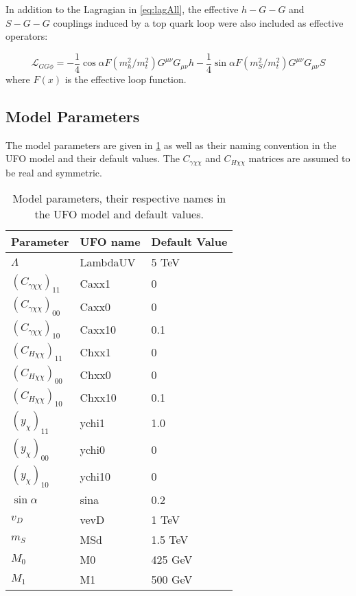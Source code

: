 \documentclass[a4paper,11pt]{article}
\begin{document}
In addition to the Lagragian in \cref{eq:lagAll}, the effective $h-G-G$ and $S-G-G$ couplings induced by a top quark loop were also included as effective operators:

\begin{equation*}
	\mathcal{L}_{GG\phi} = -\frac{1}{4} \cos\alpha F(m_h^2/m_t^2) G^{\mu\nu} G_{\mu\nu} h -\frac{1}{4} \sin\alpha F(m_S^2/m_t^2) G^{\mu\nu} G_{\mu\nu} S
\end{equation*}
where $F(x)$ is the effective loop function.
\subsection*{Model Parameters}

The model parameters are given in \cref{tab:parameters} as well as their naming convention in the UFO model and their default values. The $C_{\gamma \chi\chi}$ and $C_{H \chi\chi}$ matrices are assumed to be real and symmetric.


\begin{table}[h!]   \centering
	\vspace{0.2cm}
	\caption{Model parameters, their respective names in the UFO model and default values.\label{tab:parameters}}
	\begin{tabular}{p{2cm}|p{3cm}|p{3cm}}
		\toprule
		\textbf{Parameter} & \textbf{UFO name} & \textbf{Default Value}\\ \toprule 
		$\Lambda$  & LambdaUV & 5 TeV\\
		$(C_{\gamma \chi\chi})_{11}$  & Caxx1 & 0\\
		$(C_{\gamma \chi\chi})_{00}$  & Caxx0 & 0\\
		$(C_{\gamma \chi\chi})_{10}$  & Caxx10 & 0.1\\
		$(C_{H \chi\chi})_{11}$  & Chxx1 & 0\\
		$(C_{H \chi\chi})_{00}$  & Chxx0 & 0\\
		$(C_{H \chi\chi})_{10}$  & Chxx10 & 0.1\\
		$(y_\chi)_{11}$  & ychi1 & 1.0\\
		$(y_\chi)_{00}$  & ychi0 & 0\\
		$(y_\chi)_{10}$  & ychi10 & 0\\
		$\sin\alpha$  & sina & 0.2\\
		$v_D$  & vevD & 1 TeV\\
		$m_S$ & MSd & 1.5 TeV\\ 
		$M_0$ & M0 & 425 GeV\\
		$M_1$ & M1 & 500 GeV\\
		\bottomrule        
	\end{tabular}
\end{table}
\end{document}
